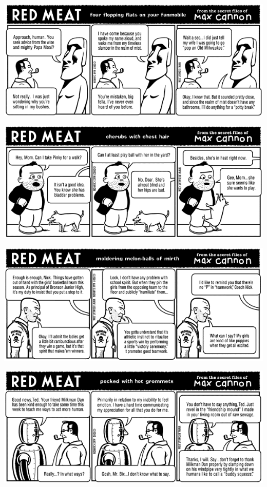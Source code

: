 \documentclass[a4paper,twoside,11pt]{article}
\begin{document}
\includegraphics[width=\textwidth]{redmeat_2002-04-16.png}



\includegraphics[width=\textwidth]{redmeat_2002-04-23.png}



\includegraphics[width=\textwidth]{redmeat_2002-04-30.png}



\includegraphics[width=\textwidth]{redmeat_2002-05-07.png}
\end{document}
